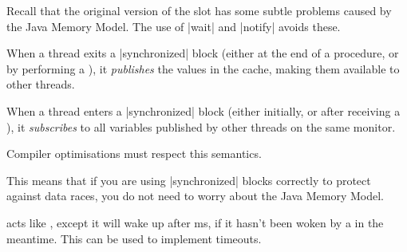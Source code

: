 
\begin{slide}

Recall that the original version of the slot has some subtle problems caused
by the Java Memory Model.  The use of |wait| and |notify| avoids these.

When a thread exits a |synchronized| block (either at the end of a
procedure, or by performing a ), it \emph{publishes} the
values in the cache, making them available to other threads.

When a thread enters a |synchronized| block (either initially, or after
receiving a ), it \emph{subscribes} to all variables
published by other threads on the same monitor.

Compiler optimisations must respect this semantics.

This means that if you are using |synchronized| blocks correctly to protect
against data races, you do not need to worry about the Java Memory Model. 


\end{slide}



\begin{slide}

 acts like , except it will wake up after
ms, if it hasn't been woken by a  in the meantime.
This can be used to implement timeouts.  




\end{slide}
